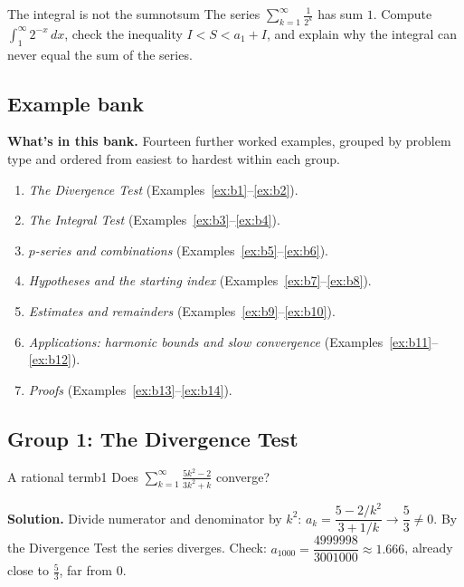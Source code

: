 \documentclass[11pt]{article}
\begin{document}
\begin{think}{The integral is not the sum}{notsum}
The series $\sum_{k=1}^\infty\frac1{2^k}$ has sum $1$. Compute $\int_1^\infty2^{-x}\,dx$, check the inequality $I<S<a_1+I$, and explain why the integral can never equal the sum of the series.
\end{think}

\subsection*{Example bank}

\textbf{What's in this bank.} Fourteen further worked examples, grouped by problem type and ordered from easiest to hardest within each group.
\begin{enumerate}[nosep]
  \item \emph{The Divergence Test} (Examples~\ref{ex:b1}--\ref{ex:b2}).
  \item \emph{The Integral Test} (Examples~\ref{ex:b3}--\ref{ex:b4}).
  \item \emph{$p$-series and combinations} (Examples~\ref{ex:b5}--\ref{ex:b6}).
  \item \emph{Hypotheses and the starting index} (Examples~\ref{ex:b7}--\ref{ex:b8}).
  \item \emph{Estimates and remainders} (Examples~\ref{ex:b9}--\ref{ex:b10}).
  \item \emph{Applications: harmonic bounds and slow convergence} (Examples~\ref{ex:b11}--\ref{ex:b12}).
  \item \emph{Proofs} (Examples~\ref{ex:b13}--\ref{ex:b14}).
\end{enumerate}

\subsection*{Group 1: The Divergence Test}

\begin{exmp}{A rational term}{b1}
Does $\displaystyle\sum_{k=1}^\infty\frac{5k^2-2}{3k^2+k}$ converge?

\textbf{Solution.} Divide numerator and denominator by $k^2$: $a_k=\dfrac{5-2/k^2}{3+1/k}\to\dfrac53\ne0$. By the Divergence Test the series diverges. Check: $a_{1000}=\dfrac{4999998}{3001000}\approx1.666$, already close to $\frac53$, far from $0$.
\end{exmp}
\end{document}
